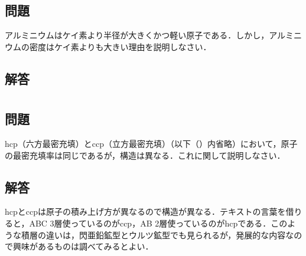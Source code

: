 \documentclass[dvipdfmx]{article}
\begin{document}
\section{}
  \subsection*{問題} %
    アルミニウムはケイ素より半径が大きくかつ軽い原子である．しかし，アルミニウムの密度はケイ素よりも大きい理由を説明しなさい．
  \subsection*{解答}

\section{}
  \subsection*{問題} %
    hcp（六方最密充填）とccp（立方最密充填）（以下（）内省略）において，原子の最密充填率は同じであるが，構造は異なる．これに関して説明しなさい．
  \subsection*{解答}
    hcpとccpは原子の積み上げ方が異なるので構造が異なる．テキストの言葉を借りると，ABC 3層使っているのがccp，AB 2層使っているのがhcpである．このような積層の違いは，閃亜鉛鉱型とウルツ鉱型でも見られるが，発展的な内容なので興味があるものは調べてみるとよい．

\section{}
\end{document}
